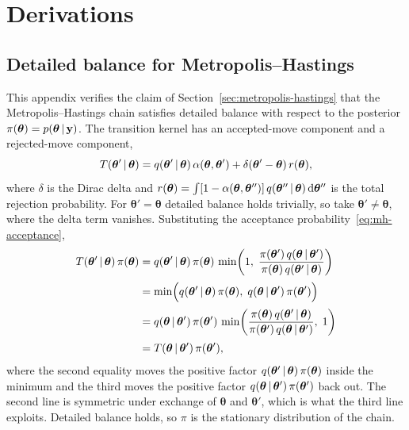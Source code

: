 
\chapter{Derivations}
\label{app:derivations}

\section{Detailed balance for Metropolis--Hastings}
\label{app:mh-detailed-balance}

This appendix verifies the claim of Section~\ref{sec:metropolis-hastings}
that the Metropolis--Hastings chain satisfies detailed balance with
respect to the posterior $\pi(\bm{\theta}) = p(\bm{\theta} \,|\,
\mathbf{y})$. The transition kernel has an accepted-move component and
a rejected-move component,
%
\begin{equation}
  T(\bm{\theta}' \,|\, \bm{\theta})
  = q(\bm{\theta}' \,|\, \bm{\theta})\,
    \alpha(\bm{\theta}, \bm{\theta}')
  + \delta(\bm{\theta}' - \bm{\theta})\,r(\bm{\theta}),
\end{equation}
%
where $\delta$ is the Dirac delta and
$r(\bm{\theta}) = \int [1 - \alpha(\bm{\theta},
\bm{\theta}'')]\,q(\bm{\theta}'' \,|\, \bm{\theta})
\,\mathrm{d}\bm{\theta}''$ is the total rejection probability. For
$\bm{\theta}' = \bm{\theta}$ detailed balance holds trivially, so take
$\bm{\theta}' \neq \bm{\theta}$, where the delta term vanishes.
Substituting the acceptance probability~\eqref{eq:mh-acceptance},
%
\begin{align}
  T(\bm{\theta}' \,|\, \bm{\theta})\,\pi(\bm{\theta})
  &= q(\bm{\theta}' \,|\, \bm{\theta})\,
     \pi(\bm{\theta})\,
     \min\!\left(1,\;
     \frac{\pi(\bm{\theta}')\,q(\bm{\theta} \,|\, \bm{\theta}')}
          {\pi(\bm{\theta})\,q(\bm{\theta}' \,|\, \bm{\theta})}
     \right)
     \notag \\[2pt]
  &= \min\!\Big(
     q(\bm{\theta}' \,|\, \bm{\theta})\,\pi(\bm{\theta}),\;
     q(\bm{\theta} \,|\, \bm{\theta}')\,\pi(\bm{\theta}')
     \Big)
     \notag \\[2pt]
  &= q(\bm{\theta} \,|\, \bm{\theta}')\,\pi(\bm{\theta}')\,
     \min\!\left(
     \frac{\pi(\bm{\theta})\,q(\bm{\theta}' \,|\, \bm{\theta})}
          {\pi(\bm{\theta}')\,q(\bm{\theta} \,|\, \bm{\theta}')},\;
     1\right)
     \notag \\[2pt]
  &= T(\bm{\theta} \,|\, \bm{\theta}')\,\pi(\bm{\theta}'),
\end{align}
%
where the second equality moves the positive factor
$q(\bm{\theta}' \,|\, \bm{\theta})\,\pi(\bm{\theta})$ inside the
minimum and the third moves the positive factor
$q(\bm{\theta} \,|\, \bm{\theta}')\,\pi(\bm{\theta}')$ back out. The
second line is symmetric under exchange of $\bm{\theta}$ and
$\bm{\theta}'$, which is what the third line exploits. Detailed
balance holds, so $\pi$ is the stationary distribution of the chain.

